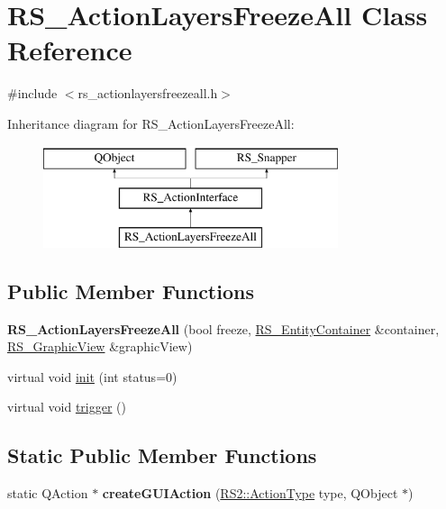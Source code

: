 \hypertarget{classRS__ActionLayersFreezeAll}{\section{R\-S\-\_\-\-Action\-Layers\-Freeze\-All Class Reference}
\label{classRS__ActionLayersFreezeAll}
}


{\ttfamily \#include $<$rs\-\_\-actionlayersfreezeall.\-h$>$}

Inheritance diagram for R\-S\-\_\-\-Action\-Layers\-Freeze\-All\-:\begin{figure}[H]
\begin{center}
\leavevmode
\includegraphics[height=3.000000cm]{classRS__ActionLayersFreezeAll}
\end{center}
\end{figure}
\subsection*{Public Member Functions}
\begin{DoxyCompactItemize}
\item 
\hypertarget{classRS__ActionLayersFreezeAll_a96fe2b30062217e9a9a1c49a297404a1}{{\bfseries R\-S\-\_\-\-Action\-Layers\-Freeze\-All} (bool freeze, \hyperlink{classRS__EntityContainer}{R\-S\-\_\-\-Entity\-Container} \&container, \hyperlink{classRS__GraphicView}{R\-S\-\_\-\-Graphic\-View} \&graphic\-View)}\label{classRS__ActionLayersFreezeAll_a96fe2b30062217e9a9a1c49a297404a1}

\item 
virtual void \hyperlink{classRS__ActionLayersFreezeAll_ad999c3530d516b91c1180a2e235822fe}{init} (int status=0)
\item 
virtual void \hyperlink{classRS__ActionLayersFreezeAll_a80c6503c79ebb84a8a9940334e5b9f37}{trigger} ()
\end{DoxyCompactItemize}
\subsection*{Static Public Member Functions}
\begin{DoxyCompactItemize}
\item 
\hypertarget{classRS__ActionLayersFreezeAll_adb2f71f343a670e0c8385394c588ed47}{static Q\-Action $\ast$ {\bfseries create\-G\-U\-I\-Action} (\hyperlink{classRS2_afe3523e0bc41fd637b892321cfc4b9d7}{R\-S2\-::\-Action\-Type} type, Q\-Object $\ast$)}\label{classRS__ActionLayersFreezeAll_adb2f71f343a670e0c8385394c588ed47}

\end{DoxyCompactItemize}

